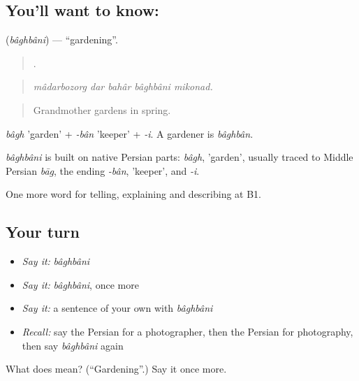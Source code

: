 \subsection*{You'll want to know: }
\textbf{} (\emph{bâghbâni}) — \textquotedblleft{}gardening\textquotedblright{}.

\begin{quote}
    .
\end{quote}

\begin{quote}
\emph{mâdarbozorg dar bahâr bâghbâni mikonad.}
\end{quote}

\begin{quote}
Grandmother gardens in spring.
\end{quote}

\emph{bâgh} 'garden' + \emph{-bân} 'keeper' + \emph{-i}. A gardener is \emph{bâghbân}.

\begin{cousinweb}
\emph{bâghbâni} is built on native Persian parts: \emph{bâgh}, 'garden', usually traced to Middle Persian \emph{bāg}, the ending \emph{-bân}, 'keeper', and \emph{-i}.
\end{cousinweb}

\begin{grammarlens}[title={What you've built}]
One more word for telling, explaining and describing at B1.
\end{grammarlens}

\subsection*{Your turn}
\begin{itemize}
\raggedright
  \item \emph{Say it:} \emph{bâghbâni}
  \item \emph{Say it:} \emph{bâghbâni}, once more
  \item \emph{Say it:} a sentence of your own with \emph{bâghbâni}
  \item \emph{Recall:} say the Persian for a photographer, then the Persian for photography, then say \emph{bâghbâni} again
\end{itemize}

\begin{tcolorbox}[breakable,colback=teal!4,colframe=teal!35!black,title={Before you move on}]
What does  mean? (\textquotedblleft{}Gardening\textquotedblright{}.) Say it once more.
\end{tcolorbox}
